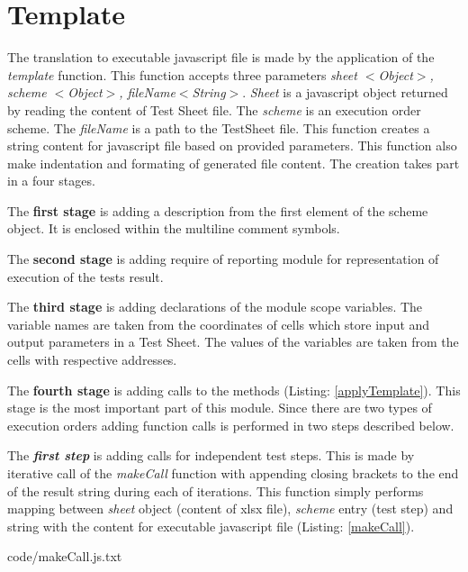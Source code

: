 \section{Template}
\label{sec:template}
The translation to executable javascript file is made by the application of the \textit{template} function. This function accepts three parameters \textit{sheet $<$Object$>$, scheme $<$Object$>$, fileName$<$String$>$}. \textit{Sheet} is a javascript object returned by reading the content of Test Sheet file. The \textit{scheme} is an execution order scheme. The \textit{fileName} is a path to the TestSheet file. This function creates a string content for javascript file based on provided parameters. This function also make indentation and formating of generated file content. The creation takes part in a four stages. 


The \textbf{first stage} is adding a description from the first element of the scheme object. It is enclosed within the multiline comment symbols.


The \textbf{second stage} is adding require of reporting module for representation of execution of the tests result.


The \textbf{third stage} is adding declarations of the module scope variables. The variable names are taken from the coordinates of cells which store input and output parameters in a Test Sheet. The values of the variables are taken from the cells with respective addresses.


The \textbf{fourth stage} is adding calls to the methods (Listing: \ref{applyTemplate}). This stage is the most important part of this module. Since there are two types of execution orders adding function calls is performed in two steps described below. 


The \textit{\textbf{first step}} is adding calls for independent test steps. This is made by iterative call of the \textit{makeCall} function with appending closing brackets to the end of the result string during each of iterations. This function simply performs mapping between \textit{sheet} object (content of xlsx file), \textit{scheme} entry (test step) and string with the content for executable javascript file (Listing: \ref{makeCall}).


{code/makeCall.js.txt}

